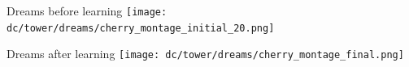 \documentclass{beamer}
\newcommand{\myPaper}[1]{
  \tikz[overlay,remember picture]
  \node[anchor=south west,align=left] at (current page.south west){#1};
}
\begin{document}
\begin{frame}{Dreams before learning}
  \texttt{[image: dc/tower/dreams/cherry\_montage\_initial\_20.png]}
\end{frame}

\begin{frame}{Dreams after learning}
  \texttt{[image: dc/tower/dreams/cherry\_montage\_final.png]}
\end{frame}

\end{document}
